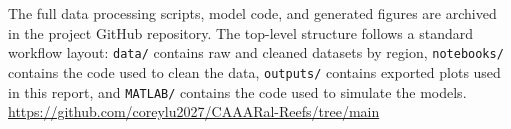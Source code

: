 \documentclass[10pt,letterpaper]{article}
\begin{document}
The full data processing scripts, model code, and generated figures are archived in the project GitHub repository. The top-level structure follows a standard workflow layout: \texttt{data/} contains raw and cleaned datasets by region, \texttt{notebooks/} contains the code used to clean the data, \texttt{outputs/} contains exported plots used in this report, and \texttt{MATLAB/} contains the code used to simulate the models.
\url{https://github.com/coreylu2027/CAAARal-Reefs/tree/main}

\newpage

\begingroup
{}


\endgroup
\end{document}
